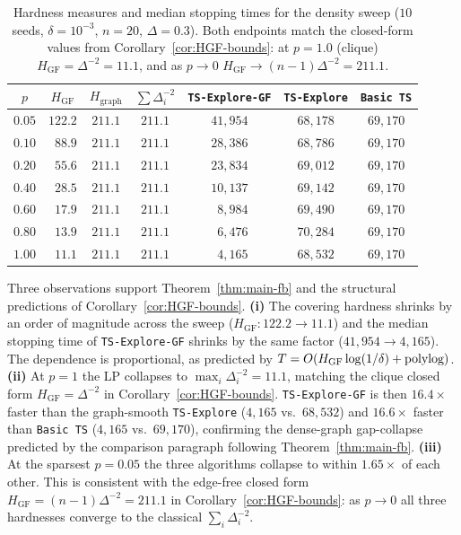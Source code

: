 \begin{table}[t]
\centering
\small
\caption{Hardness measures and median stopping times for the density sweep
($10$ seeds, $\delta=10^{-3}$, $n=20$, $\Delta=0.3$). Both endpoints
match the closed-form values from Corollary~\ref{cor:HGF-bounds}: at
$p=1.0$ (clique) $H_{\mathrm{GF}}=\Delta^{-2}=11.1$, and as $p\to 0$
$H_{\mathrm{GF}}\to (n-1)\Delta^{-2}=211.1$.}
\label{tab:exp-density}
\begin{tabular}{c c c c c c c}
\toprule
$p$ & $H_{\mathrm{GF}}$ & $H_{\mathrm{graph}}$ & $\sum\!\Delta_i^{-2}$
& \texttt{TS-Explore-GF} & \texttt{TS-Explore} & \texttt{Basic TS} \\
\midrule
$0.05$ & $122.2$ & $211.1$ & $211.1$ & $41{,}954$ & $68{,}178$ & $69{,}170$ \\
$0.10$ & $\phantom{0}88.9$ & $211.1$ & $211.1$ & $28{,}386$ & $68{,}786$ & $69{,}170$ \\
$0.20$ & $\phantom{0}55.6$ & $211.1$ & $211.1$ & $23{,}834$ & $69{,}012$ & $69{,}170$ \\
$0.40$ & $\phantom{0}28.5$ & $211.1$ & $211.1$ & $10{,}137$ & $69{,}142$ & $69{,}170$ \\
$0.60$ & $\phantom{0}17.9$ & $211.1$ & $211.1$ & $\phantom{0}8{,}984$ & $69{,}490$ & $69{,}170$ \\
$0.80$ & $\phantom{0}13.9$ & $211.1$ & $211.1$ & $\phantom{0}6{,}476$ & $70{,}284$ & $69{,}170$ \\
$1.00$ & $\phantom{0}11.1$ & $211.1$ & $211.1$ & $\phantom{0}4{,}165$ & $68{,}532$ & $69{,}170$ \\
\bottomrule
\end{tabular}
\end{table}

Three observations support Theorem~\ref{thm:main-fb} and the structural
predictions of Corollary~\ref{cor:HGF-bounds}.
\textbf{(i)} The covering hardness shrinks by an order of magnitude across
the sweep ($H_{\mathrm{GF}}\colon 122.2\to 11.1$) and the median stopping
time of \texttt{TS-Explore-GF} shrinks by the same factor
($41{,}954\to 4{,}165$). The dependence is proportional, as predicted by
$T=O(H_{\mathrm{GF}}\log(1/\delta)+\textnormal{polylog})$.
\textbf{(ii)} At $p=1$ the LP collapses to $\max_i\Delta_i^{-2}=11.1$,
matching the clique closed form $H_{\mathrm{GF}}=\Delta^{-2}$ in
Corollary~\ref{cor:HGF-bounds}. \texttt{TS-Explore-GF} is then $16.4\times$
faster than the graph-smooth \texttt{TS-Explore} ($4{,}165$ vs.\ $68{,}532$)
and $16.6\times$ faster than \texttt{Basic TS} ($4{,}165$ vs.\ $69{,}170$),
confirming the dense-graph gap-collapse predicted by the comparison
paragraph following Theorem~\ref{thm:main-fb}.
\textbf{(iii)} At the sparsest $p=0.05$ the three algorithms collapse to
within $1.65\times$ of each other. This is consistent with the
edge-free closed form $H_{\mathrm{GF}}=(n-1)\Delta^{-2}=211.1$ in
Corollary~\ref{cor:HGF-bounds}: as $p\to 0$ all three hardnesses converge
to the classical $\sum_i\Delta_i^{-2}$.

